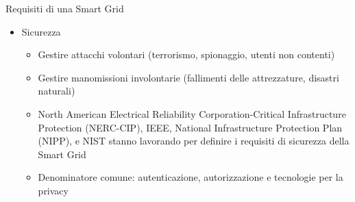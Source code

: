 \begin{frame}{Requisiti di una Smart Grid}
\begin{itemize}[<+- | alert@+>]
\item Sicurezza
	\begin{itemize}
		\item Gestire attacchi volontari (terrorismo, spionaggio, utenti non contenti)
		\item Gestire manomissioni involontarie (fallimenti delle attrezzature, disastri naturali)
		\item North American Electrical Reliability Corporation-Critical Infrastructure Protection (NERC-CIP), IEEE, National Infrastructure Protection Plan (NIPP), e NIST stanno lavorando per definire i requisiti di sicurezza della Smart Grid
		\item Denominatore comune: autenticazione, autorizzazione e tecnologie per la privacy
	\end{itemize}
\end{itemize}
\end{frame}